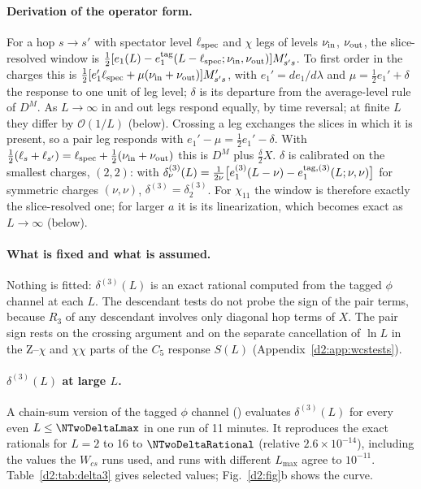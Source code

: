 \paragraph{Derivation of the operator form.} For a hop $s\to s'$ with spectator level $\ell_{\rm spec}$ and $\chi$ legs of
levels $\nu_{\rm in}$, $\nu_{\rm out}$, the slice-resolved window is $\frac12[e_1(L)-e_1^{\rm tag}(L-\ell_{\rm spec};\nu_{\rm
in},\nu_{\rm out})]M'_{s's}$. To first order in the charges this is $\frac12[e_1'\ell_{\rm spec}+\mu(\nu_{\rm in}+\nu_{\rm
out})]M'_{s's}$, with $e_1'=de_1/d\lambda$ and $\mu=\frac12e_1'+\delta$ the response to one unit of leg level; $\delta$ is its
departure from the average-level rule of $D^M$. As $L\to\infty$ in and out legs respond equally, by time reversal; at finite
$L$ they differ by $\mathcal O(1/L)$ (below). Crossing a leg exchanges the slices in which it is present, so a pair leg
responds with $e_1'-\mu=\frac12e_1'-\delta$. With $\frac12(\ell_s+\ell_{s'})=\ell_{\rm spec}+\frac12(\nu_{\rm in}+\nu_{\rm out})$ this is $D^M$
plus $\frac\delta2X$. $\delta$ is calibrated on the smallest charges, $(2,2)$: with
$\delta^{(3)}_\nu(L)=\frac1{2\nu}\big[e_1^{(3)}(L-\nu)-e_1^{{\rm tag},(3)}(L;\nu,\nu)\big]$ for symmetric charges $(\nu,\nu)$,
$\delta^{(3)}=\delta^{(3)}_2$. For $\chi_{11}$ the window is therefore exactly
the slice-resolved one; for larger $a$ it is its linearization, which becomes exact as $L\to\infty$ (below).

\paragraph{What is fixed and what is assumed.} Nothing is fitted: $\delta^{(3)}(L)$ is an exact rational computed from the
tagged $\phi$ channel at each $L$. The descendant tests do not probe the sign of the pair terms, because $R_3$ of any
descendant involves only diagonal hop terms of $X$. The pair sign rests on the crossing argument and on the separate
cancellation of $\ln L$ in the Z--$\chi$ and $\chi\chi$ parts of the $C_5$ response $S(L)$ (Appendix~\ref{d2:app:wcstests}).

\paragraph{$\delta^{(3)}(L)$ at large $L$.} A chain-sum version of the tagged $\phi$ channel
() evaluates $\delta^{(3)}(L)$ for every even $L\le\NTwoDeltaLmax$ in one run of 11
minutes. It reproduces the exact rationals for $L=2$ to 16 to $\NTwoDeltaRational$ (relative $2.6\times10^{-14}$), including
the values the $W_{cs}$ runs used, and runs with different $L_{\max}$ agree to $10^{-11}$. Table~\ref{d2:tab:delta3} gives
selected values; Fig.~\ref{d2:fig}b shows the curve.

